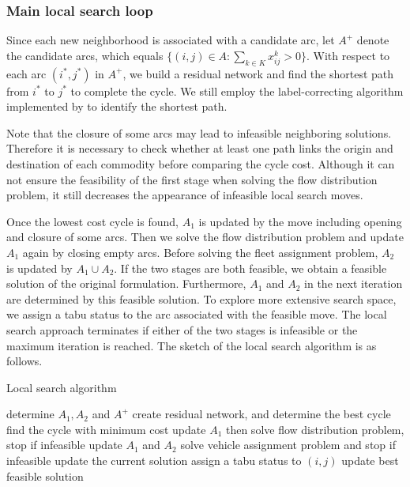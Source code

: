 \documentclass[11pt,nonblindrev,fleqn]{article}
\begin{document}
\subsubsection{Main local search loop}
Since each new neighborhood is associated with a candidate arc, let $A^+$ denote the candidate arcs, which equals $\{ (i,j)\in A: \sum_{k\in K} x_{ij}^k > 0 \}$. With respect to each arc $(i^*,j^*)$ in $A^+$, we build a residual network and find the shortest path from $i^*$ to $j^*$ to complete the cycle. We still employ the label-correcting algorithm implemented by \cite{Ahuja1993Network} to identify the shortest path.

Note that the closure of some arcs may lead to infeasible neighboring solutions. Therefore it is necessary to check whether at least one path links the origin and destination of each commodity before comparing the cycle cost. Although it can not ensure the feasibility of the first stage when solving the flow distribution problem, it still decreases the appearance of infeasible local search moves.

Once the lowest cost cycle is found, $A_1$ is updated by the move including opening and closure of some arcs. Then we solve the flow distribution problem and update $A_1$ again by closing empty arcs. Before solving the fleet assignment problem, $A_2$ is updated by $A_1 \cup A_2$. If the two stages are both feasible, we obtain a feasible solution of the original formulation. Furthermore, $A_1$ and $A_2$ in the next iteration are determined by this feasible solution. To explore more extensive search space, we assign a tabu status to the arc associated with the feasible move. The local search approach terminates if either of the two stages is infeasible or the maximum iteration is reached. The sketch of the local search algorithm is as follows.

\begin{algorithm}[H]
\caption{Local search algorithm}
\LinesNumbered
\SetNlSkip{1.2em}
{
    determine $A_1,A_2$ and $A^+$\;
    {
        create residual network, and determine the best cycle\;
    }
    find the cycle with minimum cost\;
    update $A_1$ then solve flow distribution problem, stop if infeasible\;
    update $A_1$ and $A_2$\;
    solve vehicle assignment problem and stop if infeasible\;
    update the current solution\;
    assign a tabu status to $(i,j)$\;
    {
        update best feasible solution\;
    }
}
\end{algorithm}
\end{document}
